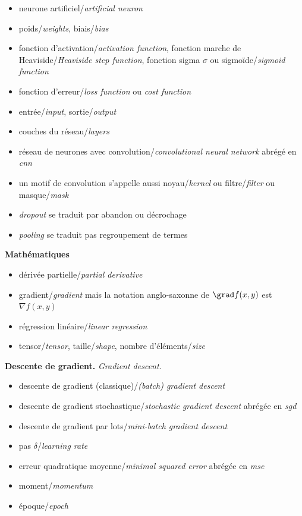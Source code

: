 \documentclass[11pt,class=report,crop=false]{standalone}
\begin{document}
\begin{itemize}
  \item neurone artificiel/\emph{artificial neuron}
  \item poids/\emph{weights}, biais/\emph{bias}
  \item fonction d'activation/\emph{activation function}, fonction marche de Heaviside/\emph{Heaviside step function}, fonction sigma $\sigma$ ou sigmoïde/\emph{sigmoid function}
  \item fonction d'erreur/\emph{loss function} ou \emph{cost function}
  \item entrée/\emph{input}, sortie/\emph{output}
  \item couches du réseau/\emph{layers}
  \item réseau de neurones avec convolution/\emph{convolutional neural network} abrégé en \emph{cnn}
  \item un motif de convolution s'appelle aussi noyau/\emph{kernel} ou filtre/\emph{filter}
 ou masque/\emph{mask}
  \item \emph{dropout} se traduit par abandon ou décrochage
  \item \emph{pooling} se traduit pas regroupement de termes
\end{itemize} 
 
\medskip

\textbf{Mathématiques}

\begin{itemize}
  \item dérivée partielle/\emph{partial derivative}
  \item gradient/\emph{gradient} mais la notation anglo-saxonne de $\grad f(x,y)$ est $\nabla f(x,y)$
  \item régression linéaire/\emph{linear regression}
  \item tensor/\emph{tensor}, taille/\emph{shape}, nombre d'éléments/\emph{size}
\end{itemize} 
 
 
\medskip
 
\textbf{Descente de gradient.} \emph{Gradient descent.}

\begin{itemize}
 \item descente de gradient (classique)/\emph{(batch) gradient descent}
 \item descente de gradient stochastique/\emph{stochastic gradient descent} abrégée en \emph{sgd}
 \item descente de gradient par lots/\emph{mini-batch gradient descent}
 \item pas $\delta$/\emph{learning rate}
 \item erreur quadratique moyenne/\emph{minimal squared error} abrégée en \emph{mse}
 \item moment/\emph{momentum}
 \item époque/\emph{epoch}
\end{itemize}  
\end{document}
